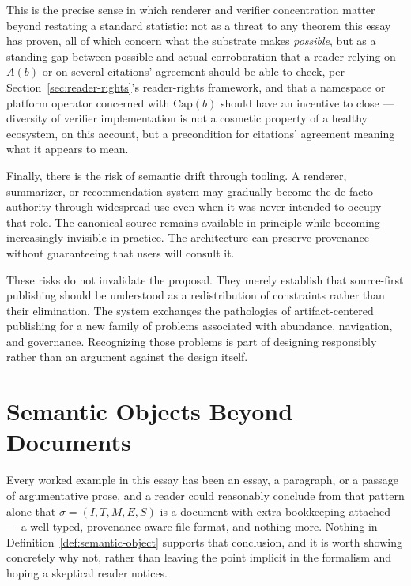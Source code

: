 \documentclass[11pt]{article}
\theoremstyle{definition}
\begin{document}
This is the precise sense in which renderer and verifier concentration matter beyond restating a standard statistic: not as a threat to any theorem this essay has proven, all of which concern what the substrate makes \emph{possible}, but as a standing gap between possible and actual corroboration that a reader relying on $A(b)$ or on several citations' agreement should be able to check, per Section~\ref{sec:reader-rights}'s reader-rights framework, and that a namespace or platform operator concerned with $\mathrm{Cap}(b)$ should have an incentive to close --- diversity of verifier implementation is not a cosmetic property of a healthy ecosystem, on this account, but a precondition for citations' agreement meaning what it appears to mean.

Finally, there is the risk of semantic drift through tooling. A renderer, summarizer, or recommendation system may gradually become the de facto authority through widespread use even when it was never intended to occupy that role. The canonical source remains available in principle while becoming increasingly invisible in practice. The architecture can preserve provenance without guaranteeing that users will consult it.

These risks do not invalidate the proposal. They merely establish that source-first publishing should be understood as a redistribution of constraints rather than their elimination. The system exchanges the pathologies of artifact-centered publishing for a new family of problems associated with abundance, navigation, and governance. Recognizing those problems is part of designing responsibly rather than an argument against the design itself.

\section{Semantic Objects Beyond Documents}
\label{sec:semantic-objects}

Every worked example in this essay has been an essay, a paragraph, or a passage of argumentative prose, and a reader could reasonably conclude from that pattern alone that $\sigma = (I,T,M,E,S)$ is a document with extra bookkeeping attached --- a well-typed, provenance-aware file format, and nothing more. Nothing in Definition~\ref{def:semantic-object} supports that conclusion, and it is worth showing concretely why not, rather than leaving the point implicit in the formalism and hoping a skeptical reader notices.
\end{document}
